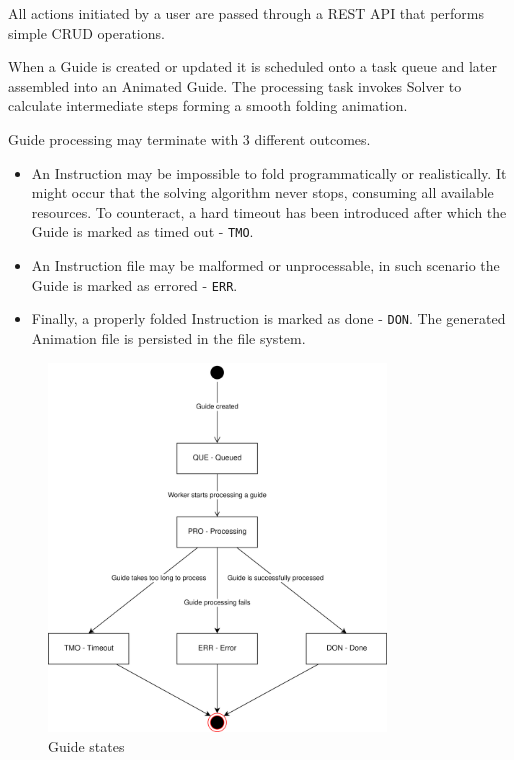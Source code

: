 All actions initiated by a user are passed through a REST API that performs simple CRUD operations.

\bigskip

When a Guide is created or updated it is scheduled onto a task queue and later assembled into an Animated Guide. The processing task invokes Solver to calculate intermediate steps forming a smooth folding animation. 

\medskip 
Guide processing may terminate with 3 different outcomes.

\begin{itemize}
	\item An Instruction may be impossible to fold programmatically or realistically. It might occur that the solving algorithm never stops, consuming all available resources. To counteract, a hard timeout has been introduced after which the Guide is marked as timed out - \texttt{TMO}.
	\item An Instruction file may be malformed or unprocessable, in such scenario the Guide is marked as errored - \texttt{ERR}.
	\item Finally, a properly folded Instruction is marked as done - \texttt{DON}. The generated Animation file is persisted in the file system.
\end{itemize}


\begin{figure}[H]
  \caption{Guide states}
  \centering
    \includegraphics[width=0.8\textwidth]{assets/3-guide-states.png}
\end{figure}


